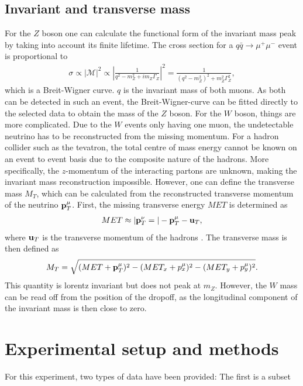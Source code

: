 \documentclass[twoside,        %
               BCOR12mm,       %
               ngerman,english, %
               fleqn,headsepline=false,footsepline=false
              ]{Vorlage/MFPREPORT}
\begin{document}
\subsection{Invariant and transverse mass}
For the $Z$ boson one can calculate the functional form of the invariant mass
peak by taking into account its finite lifetime.
The cross section for a $q\bar q\rightarrow \mu^+\mu^-$ event is proportional
to \cite{thomson} 
\begin{align}
    \sigma\propto|\mathcal{M}|^2\propto\left|\frac{1}{q^2-m_Z^2+im_Z\Gamma_Z}\right|^2=\frac{1}{(q^2-m_Z^2)^2+m_Z^2\Gamma_Z^2},
    \label{eq:breit}
\end{align}which is a Breit-Wigner curve.
$q$ is the invariant mass of both muons. As both can be detected in such an
event, the Breit-Wigner-curve can be fitted directly to the selected data to
obtain the mass of the $Z$ boson.
For the $W$ boson, things are more complicated. Due to the $W$ events only
having one muon, the undetectable neutrino has to be reconstructed from the
missing momentum. For a hadron collider such as the tevatron, the total
centre of mass energy cannot be known on an event to event basis due to
the composite nature of the hadrons. More specifically, the $z$-momentum of the
interacting partons are unknown, making the invariant mass reconstruction
impossible. However, one can define the transverse mass $M_T$, which can be
calculated from the reconstructed transverse momentum of the neutrino
$\bold{p}_T^\mu$. First, the missing transverse energy $MET$ is determined as
\begin{align}
    MET\approx|\bold{p}_T^\nu=|-\bold{p}_T^\mu-\bold{u}_T,
    \label{eq:met}
\end{align}where $\bold{u}_T$ is the transverse momentum of the hadrons
\cite{thomson}.
The transverse mass is then defined as
\begin{align}
    M_T=\sqrt{(MET+\bold{p}_T^\mu)^2-(MET_x+p_x^\mu)^2-(MET_y+p_y^\mu)^2}.
    \label{eq:mt}
\end{align}
This quantity is lorentz invariant but does not peak at $m_Z$. However, the $W$
mass can be read off from the position of the dropoff, as the longitudinal
component of the invariant mass is then close to zero.


\section{Experimental setup and methods}
\label{sec:setup}
For this experiment, two types of data have been provided: The first is a subset
\end{document}
